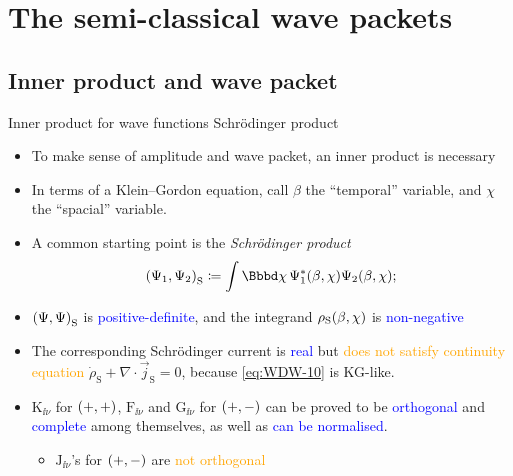 \documentclass[8pt]{beamer}
\begin{document}
\section{The semi-classical wave packets}

\subsection{Inner product and wave packet}

\begin{frame}%
{Inner product for wave functions}%
{Schrödinger product}
\begin{itemize}
\item To make sense of amplitude and wave packet, an inner product is necessary

\item In terms of a Klein--Gordon equation, call $\beta$ the ``temporal'' 
variable, and $\chi$ the ``spacial'' variable.

\item A common starting point is the
\emph{Schrödinger product}
\begin{align}
\rbr{\Psi_1,\Psi_2}_\text{S} \coloneqq
\int \dd \chi\,\rfun{\Psi_1^*}{\beta,\chi} \rfun{\Psi_2}{\beta,\chi};
\end{align}
\item ${\left(\Psi, \Psi\right)}_\text{S}$ is \textcolor{blue}{positive-definite},
and the integrand ${\rho_\text{S}}\mathopen{}\left(\beta,\chi\right)\mathclose{}$ is
\textcolor{blue}{non-negative}


\item The corresponding Schrödinger current is \textcolor{blue}{real} but
\textcolor{orange}{does not satisfy continuity equation}
$\dot{\rho}_\text{S} + \nabla\cdot \vec{j}_\text{S} = 0$, because 
\cref{eq:WDW-10} is KG-like.
\item $\mathrm{K}_{\ii\nu}$%
 for ${\left(+,+\right)}$, 
$\mathrm{F}_{\ii\nu}$ and $\mathrm{G}_{\ii\nu}$ for ${\left(+,-\right)}$ can be proved 
to be \textcolor{blue}{orthogonal} and \textcolor{blue}{complete}
among themselves, as well as \textcolor{blue}{can be normalised}.
\begin{itemize}
\item $\mathrm{J}_{\ii\nu}$'s for ${\left(+,-\right)}$ are
\textcolor{orange}{not orthogonal}
\end{itemize}

\end{itemize}
\end{frame}
\end{document}
